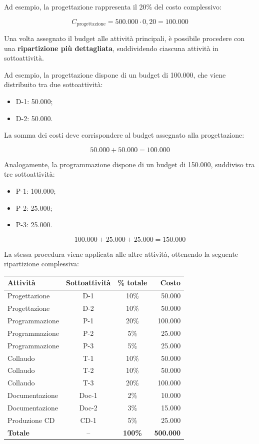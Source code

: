 \noindent Ad esempio, la progettazione rappresenta
il 20\% del costo complessivo:

\[
C_{\text{progettazione}}
=500.000\cdot0{,}20
=\boxed{100.000}
\]

\noindent Una volta assegnato il budget alle attività
principali, è possibile procedere con una
\textbf{ripartizione più dettagliata},
suddividendo ciascuna attività in sottoattività.

\medskip

\noindent Ad esempio, la progettazione dispone
di un budget di 100.000, che viene distribuito
tra due sottoattività:

\begin{itemize}
    \item D-1: 50.000;
    \item D-2: 50.000.
\end{itemize}

\noindent La somma dei costi deve corrispondere
al budget assegnato alla progettazione:

\[
50.000+50.000=\boxed{100.000}
\]

\noindent Analogamente, la programmazione
dispone di un budget di 150.000,
suddiviso tra tre sottoattività:

\begin{itemize}
    \item P-1: 100.000;
    \item P-2: 25.000;
    \item P-3: 25.000.
\end{itemize}

\[
100.000+25.000+25.000=\boxed{150.000}
\]

\noindent La stessa procedura viene applicata
alle altre attività, ottenendo la seguente
ripartizione complessiva:

\begin{center}
\small
\begin{tabular}{|l|c|c|r|}
\hline
\textbf{Attività} &
\textbf{Sottoattività} &
\textbf{\% totale} &
\textbf{Costo} \\
\hline
Progettazione & D-1 & 10\% & 50.000 \\
\hline
Progettazione & D-2 & 10\% & 50.000 \\
\hline
Programmazione & P-1 & 20\% & 100.000 \\
\hline
Programmazione & P-2 & 5\% & 25.000 \\
\hline
Programmazione & P-3 & 5\% & 25.000 \\
\hline
Collaudo & T-1 & 10\% & 50.000 \\
\hline
Collaudo & T-2 & 10\% & 50.000 \\
\hline
Collaudo & T-3 & 20\% & 100.000 \\
\hline
Documentazione & Doc-1 & 2\% & 10.000 \\
\hline
Documentazione & Doc-2 & 3\% & 15.000 \\
\hline
Produzione CD & CD-1 & 5\% & 25.000 \\
\hline
\textbf{Totale} & -- & \textbf{100\%} &
\textbf{500.000} \\
\hline
\end{tabular}
\end{center}

